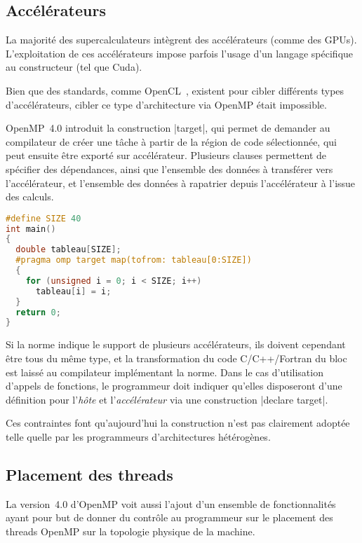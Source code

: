 \subsection{Accélérateurs}

La majorité des supercalculateurs intègrent des accélérateurs (comme des GPUs).
L'exploitation de ces accélérateurs impose parfois l'usage d'un langage spécifique au constructeur (tel que Cuda).

Bien que des standards, comme OpenCL~\cite{Stone2010}, existent pour cibler différents types d'accélérateurs, cibler ce type d'architecture via OpenMP était impossible.

OpenMP~4.0 introduit la construction |target|, qui permet de demander au compilateur de créer une tâche à partir de la région de code sélectionnée, qui peut ensuite être exporté sur accélérateur.
Plusieurs clauses permettent de spécifier des dépendances, ainsi que l'ensemble des données à transférer vers l'accélérateur, et l'ensemble des données à rapatrier depuis l'accélérateur à l'issue des calculs.

\begin{lstlisting}[language=c++,caption=Addition sur un accélérateur,label=lst:context:openmp:target,basicstyle=\small]
#define SIZE 40
int main()
{
  double tableau[SIZE];
  #pragma omp target map(tofrom: tableau[0:SIZE])
  {
    for (unsigned i = 0; i < SIZE; i++)
      tableau[i] = i;
  }
  return 0;
}
\end{lstlisting}


Si la norme indique le support de plusieurs accélérateurs, ils doivent cependant être tous du même type, et la transformation du code C/C++/Fortran du bloc est laissé au compilateur implémentant la norme.
Dans le cas d'utilisation d'appels de fonctions, le programmeur doit indiquer qu'elles disposeront d'une définition pour l'\emph{hôte} et l'\emph{accélérateur} via une construction |declare target|.

Ces contraintes font qu'aujourd'hui la construction n'est pas clairement adoptée telle quelle par les programmeurs d'architectures hétérogènes.

\subsection{Placement des threads}

La version~4.0 d'OpenMP voit aussi l'ajout d'un ensemble de fonctionnalités ayant pour but de donner du contrôle au programmeur sur le placement des threads OpenMP sur la topologie physique de la machine.

